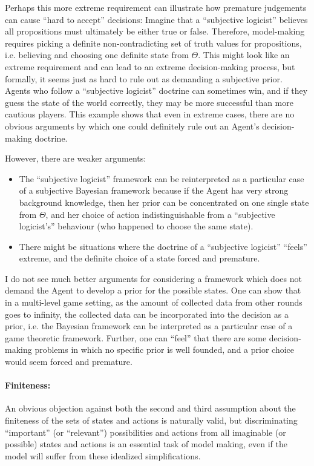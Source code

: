 \documentclass{article}
\begin{document}
Perhaps this more extreme requirement can illustrate how premature judgements can cause ``hard to accept'' decisions:
Imagine that a ``subjective logicist'' believes all propositions must ultimately be either true or false. Therefore, model-making requires picking a definite non-contradicting set of truth values for propositions, i.e. believing and choosing one definite state from $\Theta$.
This might look like an extreme requirement and can lead to an extreme decision-making process, but formally, it seems just as hard to rule out as demanding a subjective prior. Agents who follow a ``subjective logicist'' doctrine can sometimes win, and if they guess the state of the world correctly, they may be more successful than more cautious players.
This example shows that even in extreme cases, there are no obvious arguments by which one could definitely rule out an Agent's decision-making doctrine.

However, there are weaker arguments:
\begin{itemize}
    \item The ``subjective logicist'' framework can be reinterpreted as a particular case of a subjective Bayesian framework because if the Agent has very strong background knowledge, then her prior can be concentrated on one single state from $\Theta$, and her choice of action indistinguishable from a ``subjective logicist's'' behaviour (who happened to choose the same state).
    \item There might be situations where the doctrine of a ``subjective logicist'' ``feels'' extreme, and the definite choice of a state forced and premature.
\end{itemize}

I do not see much better arguments for considering a framework which does not demand the Agent to develop a prior for the possible states. One can show that in a multi-level game setting, as the amount of collected data from other rounds goes to infinity, the collected data can be incorporated into the decision as a prior, i.e. the Bayesian framework can be interpreted as a particular case of a game theoretic framework. Further, one can ``feel'' that there are some decision-making problems in which no specific prior is well founded, and a prior choice would seem forced and premature.

\paragraph{Finiteness:}
An obvious objection against both the second and third assumption about the finiteness of the sets of states and actions is naturally valid, but discriminating ``important'' (or ``relevant'') possibilities and actions from all imaginable (or possible) states and actions is an essential task of model making, even if the model will suffer from these idealized simplifications.
\end{document}
